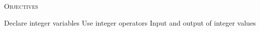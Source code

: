 \textsc{Objectives}
 \begin{myenum}
   \li Declare integer variables
   \li Use integer operators
   \li Input and output of integer values
 \end{myenum}

